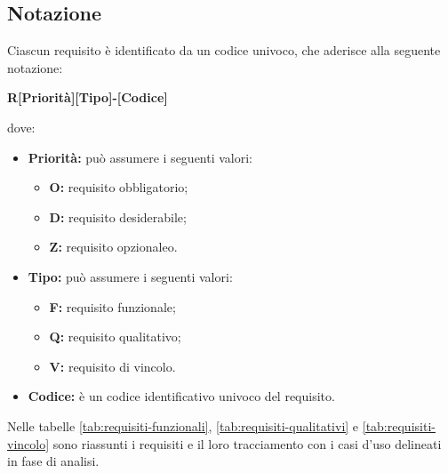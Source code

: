 \subsection{Notazione}
Ciascun requisito è identificato da un codice univoco, che aderisce alla
seguente notazione:
\begin{center}
    \textbf{R[Priorità][Tipo]-[Codice]}
\end{center}
dove:
\begin{itemize}
    \item \textbf{Priorità:} può assumere i seguenti valori:
          \begin{itemize}
              \item \textbf{O:} requisito obbligatorio;
              \item \textbf{D:} requisito desiderabile;
              \item \textbf{Z:} requisito opzionaleo.
          \end{itemize}
    \item \textbf{Tipo:} può assumere i seguenti valori:
          \begin{itemize}
              \item \textbf{F:} requisito funzionale;
              \item \textbf{Q:} requisito qualitativo;
              \item \textbf{V:} requisito di vincolo.
          \end{itemize}
    \item \textbf{Codice:} è un codice identificativo univoco del requisito.
\end{itemize}

Nelle tabelle \ref{tab:requisiti-funzionali}, \ref{tab:requisiti-qualitativi} e
\ref{tab:requisiti-vincolo} sono riassunti i requisiti e il loro tracciamento
con i casi d'uso delineati in fase di analisi.

\newpage

